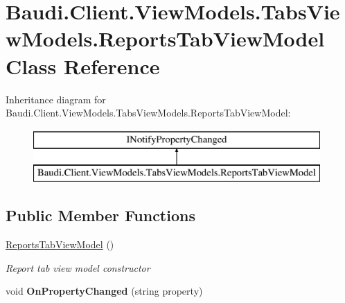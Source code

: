 \hypertarget{class_baudi_1_1_client_1_1_view_models_1_1_tabs_view_models_1_1_reports_tab_view_model}{}\section{Baudi.\+Client.\+View\+Models.\+Tabs\+View\+Models.\+Reports\+Tab\+View\+Model Class Reference}
\label{class_baudi_1_1_client_1_1_view_models_1_1_tabs_view_models_1_1_reports_tab_view_model}
Inheritance diagram for Baudi.\+Client.\+View\+Models.\+Tabs\+View\+Models.\+Reports\+Tab\+View\+Model\+:\begin{figure}[H]
\begin{center}
\leavevmode
\includegraphics[height=2.000000cm]{class_baudi_1_1_client_1_1_view_models_1_1_tabs_view_models_1_1_reports_tab_view_model}
\end{center}
\end{figure}
\subsection*{Public Member Functions}
\begin{DoxyCompactItemize}
\item 
\hyperlink{class_baudi_1_1_client_1_1_view_models_1_1_tabs_view_models_1_1_reports_tab_view_model_a5fddbeb94b8f899cc40c938b4cf04ff8}{Reports\+Tab\+View\+Model} ()
\begin{DoxyCompactList}\small\item\em Report tab view model constructor \end{DoxyCompactList}\item 
\hypertarget{class_baudi_1_1_client_1_1_view_models_1_1_tabs_view_models_1_1_reports_tab_view_model_a2a65b3ac55610d220df439138b20ff39}{}void {\bfseries On\+Property\+Changed} (string property)\label{class_baudi_1_1_client_1_1_view_models_1_1_tabs_view_models_1_1_reports_tab_view_model_a2a65b3ac55610d220df439138b20ff39}

\end{DoxyCompactItemize}
